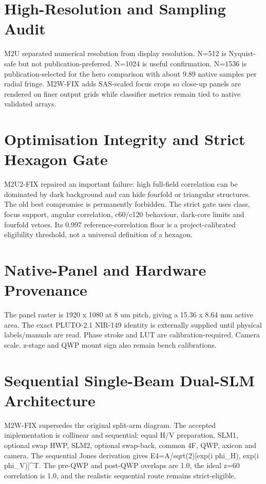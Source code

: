 \documentclass[11pt]{article}
\begin{document}
\section{High-Resolution and Sampling Audit}
M2U separated numerical resolution from display resolution. N=512 is Nyquist-safe but not publication-preferred. N=1024 is useful confirmation. N=1536 is publication-selected for the hero comparison with about 9.89 native samples per radial fringe. M2W-FIX adds SAS-scaled focus crops so close-up panels are rendered on finer output grids while classifier metrics remain tied to native validated arrays.

\section{Optimisation Integrity and Strict Hexagon Gate}
M2U2-FIX repaired an important failure: high full-field correlation can be dominated by dark background and can hide fourfold or triangular structures. The old best compromise is permanently forbidden. The strict gate uses class, focus support, angular correlation, c60/c120 behaviour, dark-core limits and fourfold vetoes. Its 0.997 reference-correlation floor is a project-calibrated eligibility threshold, not a universal definition of a hexagon.

\section{Native-Panel and Hardware Provenance}
The panel raster is 1920 x 1080 at 8 um pitch, giving a 15.36 x 8.64 mm active area. The exact PLUTO-2.1 NIR-149 identity is externally supplied until physical labels/manuals are read. Phase stroke and LUT are calibration-required. Camera scale, z-stage and QWP mount sign also remain bench calibrations.

\section{Sequential Single-Beam Dual-SLM Architecture}
M2W-FIX supersedes the original split-arm diagram. The accepted implementation is collinear and sequential: equal H/V preparation, SLM1, optional swap HWP, SLM2, optional swap-back, common 4F, QWP, axicon and camera. The sequential Jones derivation gives E4=A/sqrt(2)[exp(i phi\_H), exp(i phi\_V)]\^{}T. The pre-QWP and post-QWP overlaps are 1.0, the ideal z=60 correlation is 1.0, and the realistic sequential route remains strict-eligible.
\end{document}
